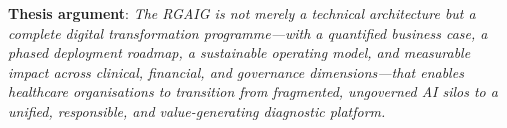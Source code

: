 \noindent \textbf{Thesis argument}: \textit{The RGAIG is not merely a technical architecture but a complete digital transformation programme---with a quantified business case, a phased deployment roadmap, a sustainable operating model, and measurable impact across clinical, financial, and governance dimensions---that enables healthcare organisations to transition from fragmented, ungoverned AI silos to a unified, responsible, and value-generating diagnostic platform.}
